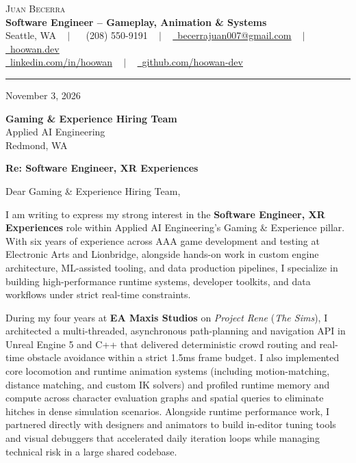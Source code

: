 \documentclass[letterpaper,11pt]{article}
\begin{document}
\begin{center}
    {\Huge \scshape Juan Becerra} \\ \vspace{4pt}
    \textbf{\large Software Engineer -- Gameplay, Animation \& Systems} \\ \vspace{4pt}
    \small Seattle, WA ~ $|$ ~
    \raisebox{-0.1\height}\faPhone\ (208) 550-9191 ~ $|$ ~
    \href{mailto:becerrajuan007@gmail.com}{\raisebox{-0.2\height}\faEnvelope\ \underline{becerrajuan007@gmail.com}} ~ $|$ ~
    \href{https://hoowan.dev}{\raisebox{-0.2\height}\faGlobe\ \underline{hoowan.dev}} \\ \vspace{2pt}
    \href{https://linkedin.com/in/hoowan/}{\raisebox{-0.2\height}\faLinkedin\ \underline{linkedin.com/in/hoowan}} ~ $|$ ~
    \href{https://github.com/hoowan-dev}{\raisebox{-0.2\height}\faGithub\ \underline{github.com/hoowan-dev}}
\end{center}

\vspace{4pt}
\hrule
\vspace{14pt}

\noindent November 3, 2026

\vspace{8pt}
\noindent \textbf{Gaming \& Experience Hiring Team} \\
Applied AI Engineering \\
Redmond, WA

\vspace{8pt}
\noindent \textbf{Re: Software Engineer, XR Experiences}

\vspace{8pt}
\noindent Dear Gaming \& Experience Hiring Team,

I am writing to express my strong interest in the \textbf{Software Engineer, XR Experiences} role within
Applied AI Engineering's Gaming \& Experience pillar. With six years of experience across AAA game
development and testing at Electronic Arts and Lionbridge, alongside hands-on work in custom engine
architecture, ML-assisted tooling, and data production pipelines, I specialize in building
high-performance runtime systems, developer toolkits, and data workflows under strict real-time constraints.

During my four years at \textbf{EA Maxis Studios} on \emph{Project Rene} (\emph{The Sims}), I architected
a multi-threaded, asynchronous path-planning and navigation API in Unreal Engine 5 and C++ that delivered
deterministic crowd routing and real-time obstacle avoidance within a strict 1.5ms frame budget. I also
implemented core locomotion and runtime animation systems (including motion-matching, distance matching,
and custom IK solvers) and profiled runtime memory and compute across character evaluation graphs and
spatial queries to eliminate hitches in dense simulation scenarios. Alongside runtime performance work,
I partnered directly with designers and animators to build in-editor tuning tools and visual debuggers
that accelerated daily iteration loops while managing technical risk in a large shared codebase.
\end{document}
